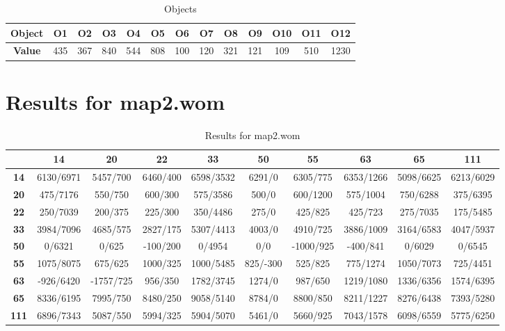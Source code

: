 \documentclass[a4paper,10pt]{article}
\begin{document}
\begin{table}[htb]
\caption{Objects}
\centering
\begin{tabular}{|c||c|c|c|c|c|c|c|c|c|c|c|c|}
\hline
\textbf{Object} & O1 & O2 & O3 & O4 & O5 & O6 & O7 & O8 & O9 & O10 & O11 & O12\\
\hline
\textbf{Value} & 435 & 367 & 840 & 544 & 808 & 100 & 120 & 321 & 121 & 109 & 510 & 1230\\
\hline
\end{tabular}
\label{table: obj_map1.wom}
\end{table}

\newpage
\section{Results for map2.wom}
\label{sec:map2.wom}

\begin{table}[htb]
\caption{Results for map2.wom}
\centering
\begin{tabular}{|c||c|c|c|c|c|c|c|c|c|}
\hline
 & \textbf{14} & \textbf{20} & \textbf{22} & \textbf{33} & \textbf{50} & \textbf{55} & \textbf{63} & \textbf{65} & \textbf{111} \\
\hline
\hline
\textbf{14} & 6130/6971 & 5457/700 & 6460/400 & 6598/3532 & 6291/0 & 6305/775 & 6353/1266 & 5098/6625 & 6213/6029 \\
\hline
\textbf{20} & 475/7176 & 550/750 & 600/300 & 575/3586 & 500/0 & 600/1200 & 575/1004 & 750/6288 & 375/6395 \\
\hline
\textbf{22} & 250/7039 & 200/375 & 225/300 & 350/4486 & 275/0 & 425/825 & 425/723 & 275/7035 & 175/5485 \\
\hline
\textbf{33} & 3984/7096 & 4685/575 & 2827/175 & 5307/4413 & 4003/0 & 4910/725 & 3886/1009 & 3164/6583 & 4047/5937 \\
\hline
\textbf{50} & 0/6321 & 0/625 & -100/200 & 0/4954 & 0/0 & -1000/925 & -400/841 & 0/6029 & 0/6545 \\
\hline
\textbf{55} & 1075/8075 & 675/625 & 1000/325 & 1000/5485 & 825/-300 & 525/825 & 775/1274 & 1050/7073 & 725/4451 \\
\hline
\textbf{63} & -926/6420 & -1757/725 & 956/350 & 1782/3745 & 1274/0 & 987/650 & 1219/1080 & 1336/6356 & 1574/6395 \\
\hline
\textbf{65} & 8336/6195 & 7995/750 & 8480/250 & 9058/5140 & 8784/0 & 8800/850 & 8211/1227 & 8276/6438 & 7393/5280 \\
\hline
\textbf{111} & 6896/7343 & 5087/550 & 5994/325 & 5904/5070 & 5461/0 & 5660/925 & 7043/1578 & 6098/6559 & 5775/6250 \\
\hline
\end{tabular}
\label{table:map2.wom}
\end{table}
\end{document}
